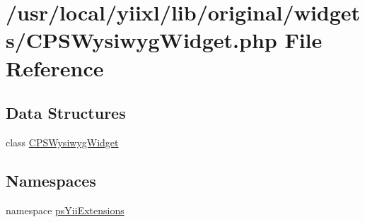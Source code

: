 \hypertarget{CPSWysiwygWidget_8php}{
\section{/usr/local/yiixl/lib/original/widgets/CPSWysiwygWidget.php File Reference}
\label{CPSWysiwygWidget_8php}
}
\subsection*{Data Structures}
\begin{DoxyCompactItemize}
\item 
class \hyperlink{classCPSWysiwygWidget}{CPSWysiwygWidget}
\end{DoxyCompactItemize}
\subsection*{Namespaces}
\begin{DoxyCompactItemize}
\item 
namespace \hyperlink{namespacepsYiiExtensions}{psYiiExtensions}
\end{DoxyCompactItemize}
